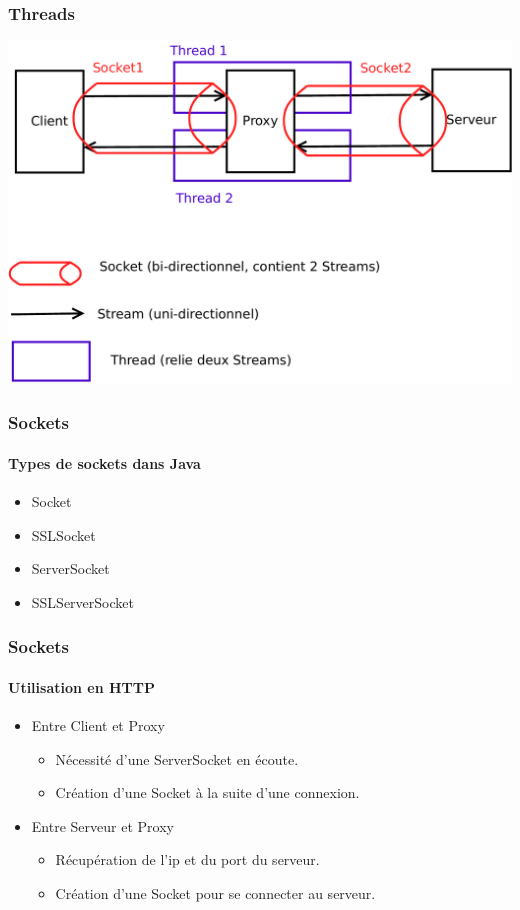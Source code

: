 	\begin{frame}
		\frametitle{Threads}		
		\includegraphics[width=\textwidth]{images/thread.pdf}
	\end{frame} 

	
	\begin{frame}
		\frametitle{Sockets}	
		\framesubtitle{Types de sockets dans Java}
		\begin{itemize}
			\item Socket
			\item SSLSocket
			\item ServerSocket
			\item SSLServerSocket
		\end{itemize}
	\end{frame} 
	
	\begin{frame}
		\frametitle{Sockets}	
		\framesubtitle{Utilisation en HTTP}
		\begin{itemize}
			\item Entre Client et Proxy
			\begin{itemize}
				\item Nécessité d'une ServerSocket en écoute.
				\item Création d'une Socket à la suite d'une connexion.
			\end{itemize}
			\item Entre Serveur et Proxy
			\begin{itemize}
				\item Récupération de l'ip et du port du serveur.
				\item Création d'une Socket pour se connecter au serveur.
			\end{itemize}
		\end{itemize}
	\end{frame}


